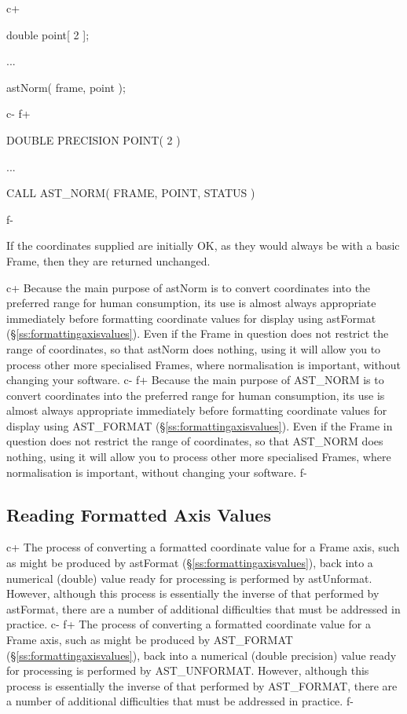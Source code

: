 \documentclass[twoside,11pt]{starlink}
\providecommand{\secref}[1]{\S\ref{#1}}
\begin{document}
c+
\small
\begin{terminalv}
double point[ 2 ];

...

astNorm( frame, point );
\end{terminalv}
\normalsize
c-
f+
\small
\begin{terminalv}
      DOUBLE PRECISION POINT( 2 )

      ...

      CALL AST_NORM( FRAME, POINT, STATUS )
\end{terminalv}
\normalsize
f-

If the coordinates supplied are initially OK, as they would always be
with a basic Frame, then they are returned unchanged.

c+
Because the main purpose of astNorm is to convert coordinates into the
preferred range for human consumption, its use is almost always
appropriate immediately before formatting coordinate values for
display using astFormat (\secref{ss:formattingaxisvalues}). Even if
the Frame in question does not restrict the range of coordinates, so
that astNorm does nothing, using it will allow you to process other
more specialised Frames, where normalisation is important, without
changing your software.
c-
f+
Because the main purpose of AST\_NORM is to convert coordinates into
the preferred range for human consumption, its use is almost always
appropriate immediately before formatting coordinate values for
display using AST\_FORMAT (\secref{ss:formattingaxisvalues}). Even if
the Frame in question does not restrict the range of coordinates, so
that AST\_NORM does nothing, using it will allow you to process other
more specialised Frames, where normalisation is important, without
changing your software.
f-

\subsection{\label{ss:unformattingaxisvalues}Reading Formatted Axis Values}

c+
The process of converting a formatted coordinate value for a Frame
axis, such as might be produced by astFormat
(\secref{ss:formattingaxisvalues}), back into a numerical (double)
value ready for processing is performed by astUnformat.  However,
although this process is essentially the inverse of that performed by
astFormat, there are a number of additional difficulties that must be
addressed in practice.
c-
f+
The process of converting a formatted coordinate value for a Frame
axis, such as might be produced by AST\_FORMAT
(\secref{ss:formattingaxisvalues}), back into a numerical (double
precision) value ready for processing is performed by AST\_UNFORMAT.
However, although this process is essentially the inverse of that
performed by AST\_FORMAT, there are a number of additional difficulties
that must be addressed in practice.
f-
\end{document}
